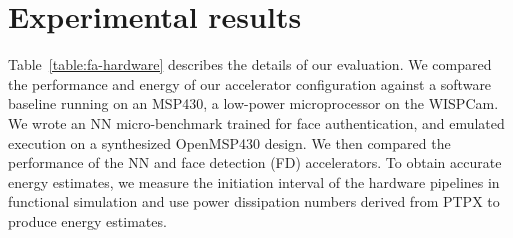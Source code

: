 


\section{Experimental results}
Table~\ref{table:fa-hardware} describes the details of our evaluation. We compared the performance and energy of our accelerator configuration against a software baseline running on an MSP430, a low-power microprocessor on the WISPCam. We wrote an NN micro-benchmark trained for face authentication, and emulated execution on a synthesized OpenMSP430 design. We then compared the performance of the NN and face detection (FD) accelerators. To obtain accurate energy estimates, we measure the initiation interval of the hardware pipelines in functional simulation
and use power dissipation numbers derived from PTPX to produce energy estimates.


